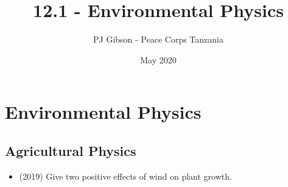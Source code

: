\documentclass{article}
\title{12.1 - Environmental Physics}
\author{PJ Gibson - Peace Corps Tanzania}
\date{May 2020}
\begin{document}
\maketitle


\section{Environmental Physics}

\subsection{Agricultural Physics}
\begin{itemize}
\item (2019)  Give two positive effects of wind on plant growth.
\end{itemize}
\end{document}

